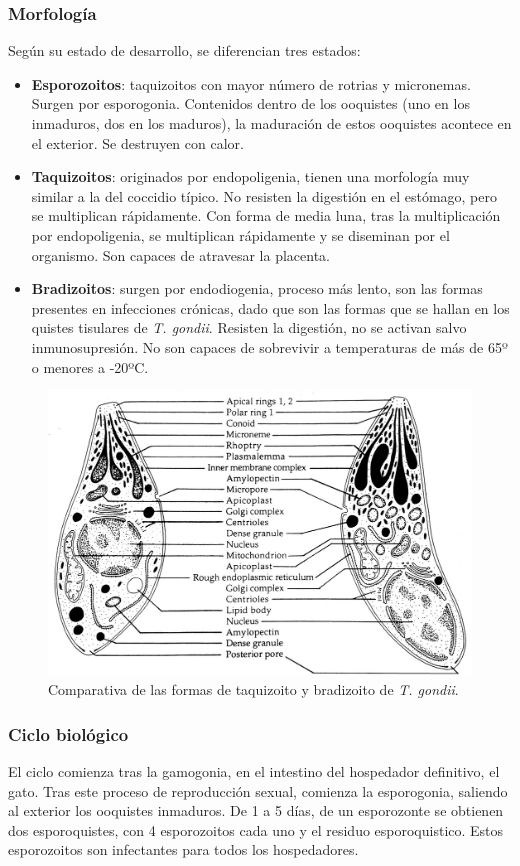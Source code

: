 \subsubsection{Morfología}
Según su estado de desarrollo, se diferencian tres estados:
\begin{itemize}[itemsep=0pt,parsep=0pt,topsep=0pt,partopsep=0pt]
	\item \textbf{Esporozoitos}: taquizoitos con mayor número de rotrias y micronemas. Surgen por esporogonia. Contenidos dentro de los ooquistes (uno en los inmaduros,  dos en los maduros), la maduración de estos ooquistes acontece en el exterior. Se destruyen con calor.
	\item \textbf{Taquizoitos}: originados por endopoligenia, tienen una morfología muy similar a la del coccidio típico. No resisten la digestión en el estómago, pero se multiplican rápidamente. Con forma de media luna, tras la multiplicación por endopoligenia, se multiplican rápidamente y se diseminan por el organismo. Son capaces de atravesar la placenta.
	\item \textbf{Bradizoitos}: surgen por endodiogenia, proceso más lento, son las formas presentes en infecciones crónicas, dado que son las formas que se hallan en los quistes tisulares de \textit{T. gondii}. Resisten la digestión, no se activan salvo inmunosupresión. No son capaces de sobrevivir a temperaturas de más de 65º o menores a -20ºC.
\end{itemize}
\begin{figure}[H]
	\centering
	\includegraphics[width=0.7\columnwidth]{A.imagenes/ACV-BioSan-Parasit-TgondiiMorf}
	\caption[Morfología de \textit{T. gondii}]{Comparativa de las formas de taquizoito y bradizoito de \textit{T. gondii}.}
\end{figure}
\subsubsection{Ciclo biológico}
El ciclo comienza tras la gamogonia, en el intestino del hospedador definitivo, el gato. Tras este proceso de reproducción sexual, comienza la esporogonia, saliendo al exterior los ooquistes inmaduros. De 1 a 5 días, de un esporozonte se obtienen dos esporoquistes, con 4 esporozoitos cada uno y el residuo esporoquistico. Estos esporozoitos son infectantes para todos los hospedadores. 

